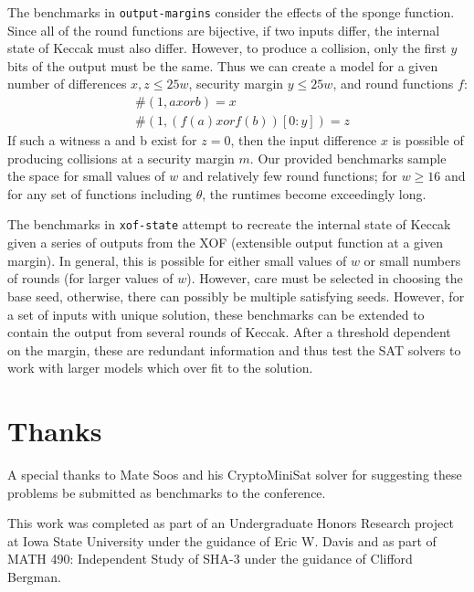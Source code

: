 \documentclass[final]{ieee}
\begin{document}
The benchmarks in \texttt{output-margins} consider the effects of the sponge
function. Since all of the round functions are bijective, if two inputs differ,
the internal state of Keccak must also differ. However, to produce a collision,
only the first $y$ bits of the output must be the same. Thus we can create
a model for a given number of differences $x, z \leq 25w$, security margin
$y \leq 25w$, and round functions $f$:
\begin{align*}
    & \#(1, a xor b) = x \\
    & \#(1, (f(a) xor f(b))[0:y]) = z
\end{align*}
If such a witness a and b exist for $z=0$, then the input difference $x$ is
possible of producing collisions at a security margin $m$. Our provided
benchmarks sample the space for small values of $w$ and relatively few
round functions; for $w\geq 16$ and for any set of functions including
$\theta$, the runtimes become exceedingly long.

The benchmarks in \texttt{xof-state} attempt to recreate the internal state
of Keccak given a series of outputs from the XOF (extensible output function
at a given margin). In general, this is possible for either small values of
$w$ or small numbers of rounds (for larger values of $w$). However, care must
be selected in choosing the base seed, otherwise, there can possibly be
multiple satisfying seeds. However, for a set of inputs with unique solution,
these benchmarks can be extended to contain the output from several rounds of
Keccak. After a threshold dependent on the margin, these are redundant
information and thus test the SAT solvers to work with larger models which
over fit to the solution.

\section{Thanks}
A special thanks to Mate Soos and his CryptoMiniSat solver
\cite{CryptoMiniSat5} for suggesting these problems be submitted as benchmarks
to the conference.

This work was completed as part of an Undergraduate Honors Research project
at Iowa State University under the guidance of Eric W. Davis and as part of
MATH 490: Independent Study of SHA-3 under the guidance of Clifford Bergman.




\vfill
\pagebreak
\end{document}
